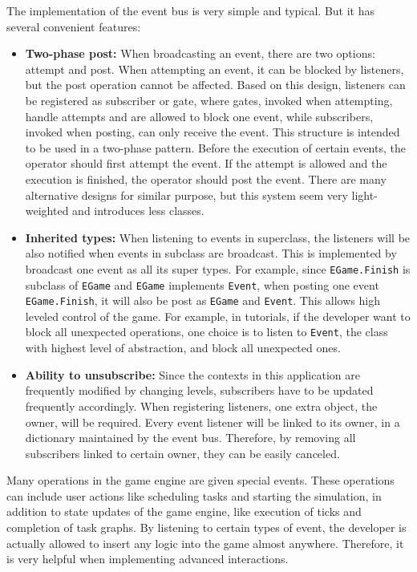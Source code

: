 \documentclass[msc,deptreport, cs]{infthesis}
\begin{document}
The implementation of the event bus is very simple and typical. But it has several convenient features:
\begin{itemize}
  \item \textbf{Two-phase post:} When broadcasting an event, there are two options: attempt and post. When attempting an event, it can be blocked by listeners, but the post operation cannot be affected. Based on this design, listeners can be registered as subscriber or gate, where gates, invoked when attempting, handle attempts and are allowed to block one event, while subscribers, invoked when posting, can only receive the event. This structure is intended to be used in a two-phase pattern. Before the execution of certain events, the operator should first attempt the event. If the attempt is allowed and the execution is finished, the operator should post the event. There are many alternative designs for similar purpose, but this system seem very light-weighted and introduces less classes.
  \item \textbf{Inherited types:} When listening to events in superclass, the listeners will be also notified when events in subclass are broadcast. This is implemented by broadcast one event as all its super types. For example, since \verb+EGame.Finish+ is subclass of \verb+EGame+ and \verb+EGame+ implements \verb+Event+, when posting one event \verb+EGame.Finish+, it will also be post as \verb+EGame+ and \verb+Event+. This allows high leveled control of the game. For example, in tutorials, if the developer want to block all unexpected operations, one choice is to listen to \verb+Event+, the class with highest level of abstraction, and block all unexpected ones.
  \item \textbf{Ability to unsubscribe:} Since the contexts in this application are frequently modified by changing levels, subscribers have to be updated frequently accordingly. When registering listeners, one extra object, the owner, will be required. Every event listener will be linked to its owner, in a dictionary maintained by the event bus. Therefore, by removing all subscribers linked to certain owner, they can be easily canceled.
\end{itemize}

Many operations in the game engine are given special events. These operations can include user actions like scheduling tasks and starting the simulation, in addition to state updates of the game engine, like execution of ticks and completion of task graphs. By listening to certain types of event, the developer is actually allowed to insert any logic into the game almost anywhere. Therefore, it is very helpful when implementing advanced interactions.
\end{document}
